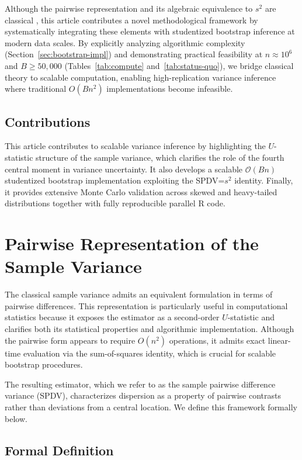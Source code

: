 \documentclass[12pt,a4paper]{article}
\begin{document}
Although the pairwise representation and its algebraic equivalence to $s^2$ are classical \citep{serfling1980,lee1990}, this article contributes a novel methodological framework by systematically integrating these elements with studentized bootstrap inference at modern data scales. By explicitly analyzing algorithmic complexity (Section~\ref{sec:bootstrap-impl}) and demonstrating practical feasibility at $n \approx 10^6$ and $B \ge 50{,}000$ (Tables~\ref{tab:compute} and~\ref{tab:status-quo}), we bridge classical theory to scalable computation, enabling high-replication variance inference where traditional $O(Bn^2)$ implementations become infeasible.

\subsection*{Contributions}

This article contributes to scalable variance inference by highlighting the $U$-statistic structure of the sample variance, which clarifies the role of the fourth central moment in variance uncertainty. It also develops a scalable $\mathcal{O}(Bn)$ studentized bootstrap implementation exploiting the SPDV=$s^2$ identity. Finally, it provides extensive Monte Carlo validation across skewed and heavy-tailed distributions together with fully reproducible parallel \textsf{R} code.


\section{Pairwise Representation of the Sample Variance}\label{sec:spdv}


The classical sample variance admits an equivalent formulation in terms of pairwise differences. This representation is particularly useful in computational statistics because it exposes the estimator as a second-order $U$-statistic and clarifies both its statistical properties and algorithmic implementation. Although the pairwise form appears to require $O(n^2)$ operations, it admits exact linear-time evaluation via the sum-of-squares identity, which is crucial for scalable bootstrap procedures. 

The resulting estimator, which we refer to as the sample pairwise difference variance (SPDV), 
characterizes dispersion as a property of pairwise contrasts rather than deviations from a central 
location. We define this framework formally below.

\subsection{Formal Definition}
\end{document}
